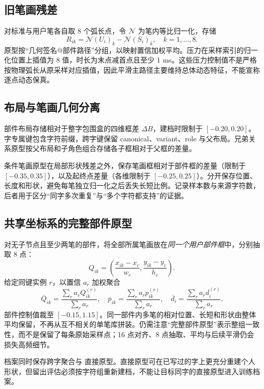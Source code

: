 \documentclass[UTF8,a4paper,11pt,fontset=fandol]{ctexart}
\newcommand{\code}[1]{\texttt{\detokenize{#1}}}
\begin{document}
\subsection{旧笔画残差}
对标准与用户笔各自取 8 个弧长点，令 $\mathcal{N}$ 为笔内等比归一化，存储
\begin{equation}
R_{ik}=\mathcal{N}(U_i)_k-\mathcal{N}(S_i)_k,\quad k=1,\ldots,8.
\end{equation}
原型按“几何签名@部件路径”分组，以映射置信加权平均。压力在采样索引的归一化位置上插值为 8 值，时长为末点减首点且至少 1 ms。这些压力控制值不是严格按物理弧长从原采样对应插值，因此平滑主路径主要维持总体动态特征，不能宣称逐点动态保真。

\subsection{布局与笔画几何分离}
部件布局存储相对于整字包围盒的四维框差 $\Delta B$，建档时限制于 $[-0.20,0.20]$。字专属键包含字符前缀，跨字键保留 canonical、variant、role 与父布局。兄弟关系原型按父布局和子角色组合存储各子框相对于父框的差量。

条件笔画原型在局部形状残差之外，保存笔画框相对于部件框的差量（限制于 $[-0.35,0.35]$），以及起终点差量（各维限制于 $[-0.25,0.25]$）。分开保存位置、长度和形状，避免每笔独立归一化之后丢失长短比例。记录样本数与来源字符数，后者用于区分“同字多次重复”与“多个字符都支持”的证据。

\subsection{共享坐标系的完整部件原型}
对无子节点且至少两笔的部件，将全部所属笔画放在\emph{同一个用户部件框}中，分别抽取 8 点：
\begin{equation}
Q_{ik}=\left(\frac{x_{ik}-x_c}{w_c},\frac{y_{ik}-y_c}{h_c}\right).
\end{equation}
给定同键实例 $r$，以置信 $a_r$ 加权聚合
\begin{equation}
\overline Q_{ik}=\frac{\sum_r a_r Q^{(r)}_{ik}}{\sum_r a_r},
\quad \overline p_{ik}=\frac{\sum_r a_r p^{(r)}_{ik}}{\sum_r a_r},
\quad \overline d_i=\frac{\sum_r a_r d_i^{(r)}}{\sum_r a_r}.
\end{equation}
部件控制值裁至 $[-0.15,1.15]$。同一部件内多笔的相对位置、长短和形状由整体平均保留，不再从互不相关的单笔库拼装。仍需注意“完整部件原型”表示整组一致性，而不是保留了每条原始采样点；16 点对齐、8 点抽取、平均与后续平滑仍会损失高频细节。

档案同时保存跨字聚合与 \code{character::component} 直接原型。直接原型可在已写过的字上更充分重建个人形状，但留出评估必须按字符组重新建档，不能让目标同字的直接原型进入训练档案。
\end{document}

